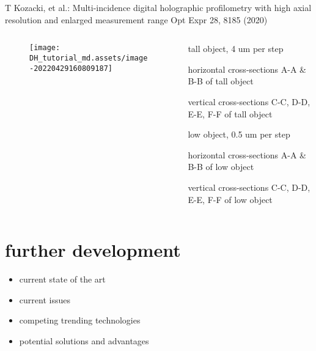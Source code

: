 \documentclass[t, aspectratio=169]{beamer}
\begin{document}
\begin{frame}{T Kozacki, et al.: Multi-incidence digital holographic profilometry with high axial resolution and enlarged measurement range}
	\vspace{-3 mm}
	\small Opt Expr 28, 8185 (2020)
	\begin{columns}
		\begin{column}{.6\textwidth}
			\begin{figure}
				\texttt{[image: DH\_tutorial\_md.assets/image-20220429160809187]}
			\end{figure}
		\end{column}
		\begin{column}{.4\textwidth}
			\begin{itemize}
			\end{itemize}
		\end{column}
	\end{columns}
\end{frame}


\section{further development}
\begin{frame}[c]
	\centering\LARGE\textbf{\secname}
\end{frame}


\begin{frame}{\secname}
	\begin{itemize}
		\item current state of the art
		\item current issues
		\item competing trending technologies
		\item potential solutions and advantages
	\end{itemize}
	\vspace{1 cm}
\end{frame}
\end{document}
